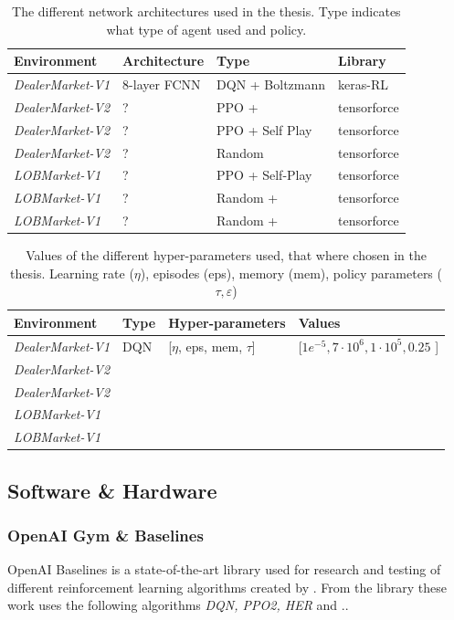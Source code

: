 \documentclass{kththesis}
\theoremstyle{definition}
\begin{document}
\begin{table}[H]
\centering
\caption{The different network architectures used in the thesis. Type indicates what type of agent used and policy.}
\label{tab:e1}
\begin{tabular}{llll}
 \textbf{Environment} & \textbf{Architecture}  & \textbf{Type}  & \textbf{Library}  \\ \hline
 \textit{DealerMarket-V1}& 8-layer FCNN  & DQN + Boltzmann  & keras-RL   \\
 \textit{DealerMarket-V2}& ?  & PPO +  & tensorforce  \\
 \textit{DealerMarket-V2}& ?  & PPO + Self Play  & tensorforce  \\
 \textit{DealerMarket-V2} & ?  & Random  & tensorforce \\
 \textit{LOBMarket-V1} & ?  & PPO + Self-Play  & tensorforce \\ 
 \textit{LOBMarket-V1} & ?  & Random +  & tensorforce \\ 
 \textit{LOBMarket-V1} & ?  & Random +  & tensorforce
\end{tabular}
\end{table}

\begin{table}[H]
\centering
\caption{Values of the different hyper-parameters used, that where chosen in the thesis. Learning rate ($\eta$), episodes (eps), memory (mem), policy parameters ($\tau, \varepsilon$)}
\label{tab:e2}
\begin{tabular}{llll}
 \textbf{Environment} & \textbf{Type} & \textbf{Hyper-parameters} & \textbf{Values}  \\ \hline
 \textit{DealerMarket-V1} & DQN  & [$\eta$, eps, mem, $\tau$] & [$1e^{-5}, 7\cdot10^6, 1\cdot10^5, 0.25$ ]  \\
 \textit{DealerMarket-V2} &  & &   \\
 \textit{DealerMarket-V2} &  & &  \\
 \textit{LOBMarket-V1} &  & &  \\
 \textit{LOBMarket-V1} &  & & 
\end{tabular}
\end{table}
\subsection{Software \& Hardware}

\subsubsection*{OpenAI Gym \& Baselines}
OpenAI Baselines is a state-of-the-art library used for research and testing of different reinforcement learning algorithms created by \textcite{baselines}. From the library these work uses the following algorithms \textit{DQN, PPO2, HER} and ..
\end{document}
